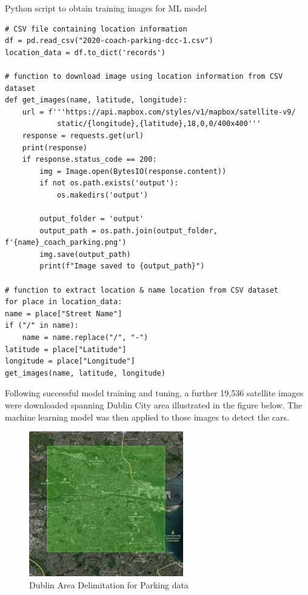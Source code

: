 \begin{listing}[htbp]
    \centering
    \caption{Python script to obtain training images for ML model}
    \begin{verbatim}
# CSV file containing location information
df = pd.read_csv("2020-coach-parking-dcc-1.csv")
location_data = df.to_dict('records')

# function to download image using location information from CSV dataset
def get_images(name, latitude, longitude):
    url = f'''https://api.mapbox.com/styles/v1/mapbox/satellite-v9/
            static/{longitude},{latitude},18,0,0/400x400'''
    response = requests.get(url)
    print(response)
    if response.status_code == 200:
        img = Image.open(BytesIO(response.content))
        if not os.path.exists('output'):
            os.makedirs('output')

        output_folder = 'output'
        output_path = os.path.join(output_folder, f'{name}_coach_parking.png')
        img.save(output_path)
        print(f"Image saved to {output_path}")

# function to extract location & name location from CSV dataset
for place in location_data:
name = place["Street Name"]
if ("/" in name):
    name = name.replace("/", "-")
latitude = place["Latitude"]
longitude = place["Longitude"]
get_images(name, latitude, longitude)
    \end{verbatim}
\end{listing}
Following successful model training and tuning, a further 19,536 satellite
images were downloaded spanning Dublin City area illustrated in the figure
below. The machine learning model was then applied to those images to detect the
cars.
\begin{figure}[htbp]
    \centering
    \includegraphics[width=0.6\textwidth]{images/dublin-img-area.jpg}
    \caption{Dublin Area Delimitation for Parking data}
\end{figure}

